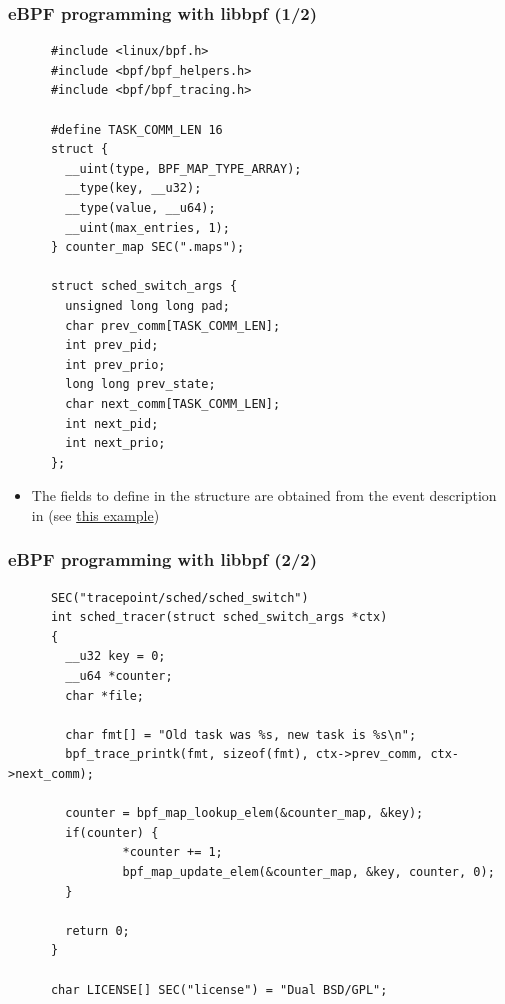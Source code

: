 \begin{frame}[fragile]
  \frametitle{eBPF programming with libbpf (1/2)}
  \begin{block}{}
    \begin{verbatim}
      #include <linux/bpf.h>
      #include <bpf/bpf_helpers.h>
      #include <bpf/bpf_tracing.h>

      #define TASK_COMM_LEN 16
      struct {
        __uint(type, BPF_MAP_TYPE_ARRAY);
        __type(key, __u32);
        __type(value, __u64);
        __uint(max_entries, 1);
      } counter_map SEC(".maps");

      struct sched_switch_args {
        unsigned long long pad;
        char prev_comm[TASK_COMM_LEN];
        int prev_pid;
        int prev_prio;
        long long prev_state;
        char next_comm[TASK_COMM_LEN];
        int next_pid;
        int next_prio;
      };
    \end{verbatim}
  \end{block}

  \begin{itemize}
  \item The fields to define in the  structure are obtained
    from the event description in  (see
    \href{https://elixir.bootlin.com/linux/v6.12/source/tools/testing/selftests/bpf/progs/test_stacktrace_map.c#L41}
         {this example})
  \end{itemize}
\end{frame}

\begin{frame}[fragile]
  \frametitle{eBPF programming with libbpf (2/2)}
  \begin{block}{}
    \begin{verbatim}
      SEC("tracepoint/sched/sched_switch")
      int sched_tracer(struct sched_switch_args *ctx)
      {
        __u32 key = 0;
        __u64 *counter;
        char *file;

        char fmt[] = "Old task was %s, new task is %s\n";
        bpf_trace_printk(fmt, sizeof(fmt), ctx->prev_comm, ctx->next_comm);

        counter = bpf_map_lookup_elem(&counter_map, &key);
        if(counter) {
                *counter += 1;
                bpf_map_update_elem(&counter_map, &key, counter, 0);
        }

        return 0;
      }

      char LICENSE[] SEC("license") = "Dual BSD/GPL";
    \end{verbatim}
  \end{block}
\end{frame}



